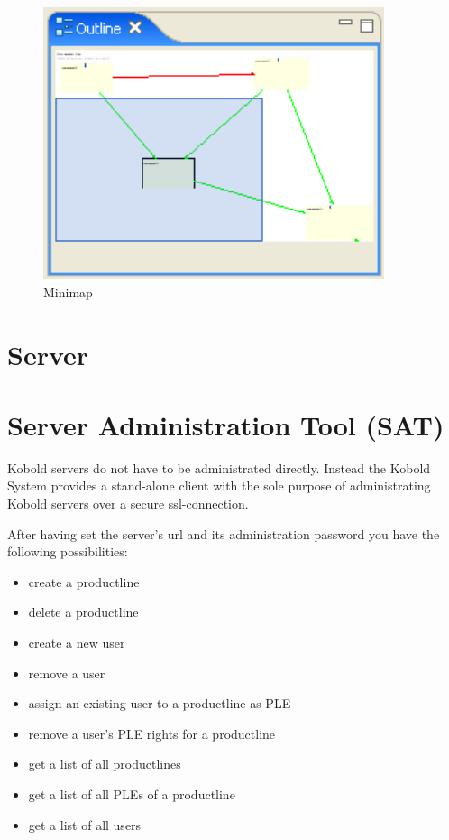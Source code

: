 \begin{figure}[h!]
\begin{center}
\includegraphics[width=10cm]{outline.png}
   \caption{Minimap}
\label{map}
\end{center}
\end{figure}\par




\section{Server}






\section{Server Administration Tool (SAT)}

Kobold servers do not have to be administrated directly. Instead the Kobold System 
provides a stand-alone client with the sole purpose of administrating Kobold servers 
over a secure ssl-connection. \par

After having set the server's url and its administration password you have the following 
possibilities:

\begin{itemize}
	\item create a productline
	\item delete a productline
	\item create a new user
	\item remove a user
	\item assign an existing user to a productline as PLE
	\item remove a user's PLE rights for a productline
	\item get a list of all productlines
	\item get a list of all PLEs of a productline
	\item get a list of all users
\end{itemize}




